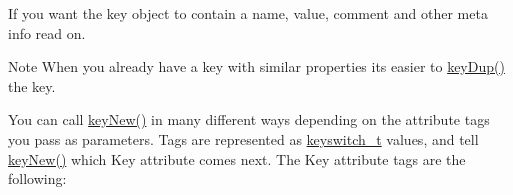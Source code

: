 \begin{DoxyCodeInclude}{0}
\DoxyCodeLine{\textcolor{comment}{// Create and initialize a key with a name and nothing else}}
\DoxyCodeLine{\textcolor{comment}{// work with it}}
\end{DoxyCodeInclude}
 If you want the key object to contain a name, value, comment and other meta info read on.

\begin{DoxyNote}{Note}
When you already have a key with similar properties its easier to \mbox{\hyperlink{group__key_gae6ec6a60cc4b8c1463fa08623d056ce3}{key\+Dup()}} the key.
\end{DoxyNote}
You can call \mbox{\hyperlink{group__key_gad23c65b44bf48d773759e1f9a4d43b89}{key\+New()}} in many different ways depending on the attribute tags you pass as parameters. Tags are represented as \mbox{\hyperlink{group__key_ga91fb3178848bd682000958089abbaf40}{keyswitch\+\_\+t}} values, and tell \mbox{\hyperlink{group__key_gad23c65b44bf48d773759e1f9a4d43b89}{key\+New()}} which Key attribute comes next. The Key attribute tags are the following\+:
